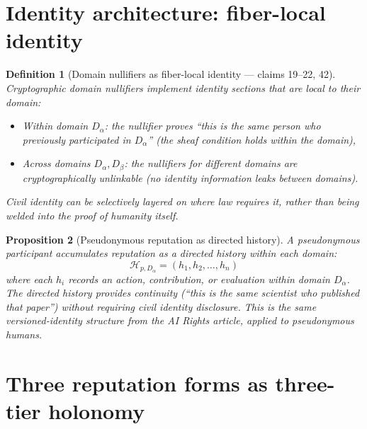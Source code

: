 \documentclass[11pt,a4paper]{article}
\newtheorem{definition}{Definition}[section]
\newtheorem{proposition}[definition]{Proposition}
\begin{document}
\section{Identity architecture: fiber-local identity}
\label{sec:identity}

\begin{definition}[Domain nullifiers as fiber-local identity --- claims 19--22, 42]
\label{def:nullifiers}
Cryptographic domain nullifiers implement identity sections that are
local to their domain:
\begin{itemize}
\item Within domain $D_\alpha$: the nullifier proves ``this is the same
  person who previously participated in $D_\alpha$'' (the sheaf condition
  holds within the domain),
\item Across domains $D_\alpha, D_\beta$: the nullifiers for different
  domains are cryptographically unlinkable (no identity information leaks
  between domains).
\end{itemize}
Civil identity can be selectively layered on where law requires it,
rather than being welded into the proof of humanity itself.
\end{definition}

\begin{proposition}[Pseudonymous reputation as directed history]
\label{prop:pseudonymous}
A pseudonymous participant accumulates reputation as a directed history
within each domain:
\[
  \mathcal{H}_{p, D_\alpha} = (h_1, h_2, \ldots, h_n)
\]
where each $h_i$ records an action, contribution, or evaluation within
domain $D_\alpha$. The directed history provides continuity (``this is the
same scientist who published that paper'') without requiring civil identity
disclosure. This is the same versioned-identity structure from the AI Rights
article, applied to pseudonymous humans.
\end{proposition}

\section{Three reputation forms as three-tier holonomy}
\label{sec:reputation}
\end{document}
